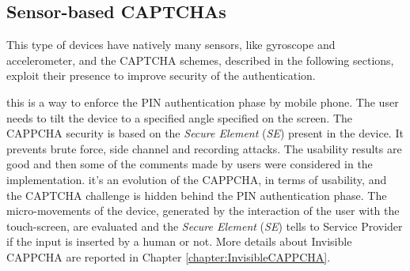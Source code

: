 \subsection{Sensor-based CAPTCHAs}
This type of devices have natively many sensors, like gyroscope and accelerometer, and the CAPTCHA schemes, described in the following sections, exploit their presence to improve security of the authentication.
\begin{itemize}
{this is a way to enforce the PIN authentication phase by mobile phone\cite{CAPPCHA}. The user needs to tilt the device to a specified angle specified on the screen. The CAPPCHA security is based on the \textit{Secure Element} (\textit{SE}) present in the device. It prevents brute force, side channel and recording attacks. The usability results are good and then some of the comments made by users were considered in the implementation.}
{it's an evolution of the CAPPCHA, in terms of usability, and the CAPTCHA challenge is hidden behind the PIN authentication phase\cite{Invisible_CAPPCHA}. The micro-movements of the device, generated by the interaction of the user with the touch-screen, are evaluated and the \textit{Secure Element} (\textit{SE}) tells to Service Provider if the input is inserted by a human or not. More details about Invisible CAPPCHA are reported in Chapter \ref{chapter:InvisibleCAPPCHA}.}
\end{itemize}

